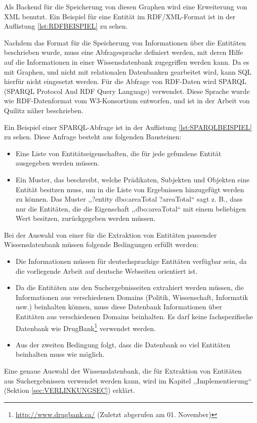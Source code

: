 Als Backend für die Speicherung von diesen Graphen wird eine Erweiterung von XML benutzt. Ein Beispiel für eine Entität im RDF/XML-Format ist in der Auflistung \ref{lst:RDFBEISPIEL} zu sehen.

\lstset{language=XML}


Nachdem das Format für die Speicherung von Informationen über die Entitäten beschrieben wurde, muss eine Abfragesprache definiert werden, mit deren Hilfe auf die Informationen in einer Wissensdatenbank zugegriffen werden kann. Da es mit Graphen, und nicht mit relationalen Datenbanken gearbeitet wird, kann SQL hierfür nicht eingesetzt werden. Für die Abfrage von RDF-Daten wird SPARQL (SPARQL Protocol And RDF Query Language) verwendet. Diese Sprache wurde wie RDF-Datenformat vom W3-Konsortium entworfen, und ist in der Arbeit von Quilitz\cite{quilitz2008querying} näher beschrieben.

Ein Beispiel einer SPARQL-Abfrage ist in der Auflistung \ref{lst:SPARQLBEISPIEL} zu sehen. Diese Anfrage besteht aus folgenden Bausteinen:
\begin{itemize}
\item Eine Liste von Entitätseigenschaften, die für jede gefundene Entität ausgegeben werden müssen.
\item Ein Muster, das beschreibt, welche Prädikaten, Subjekten und Objekten eine Entität besitzen muss, um in die Liste von Ergebnissen hinzugefügt werden zu können. Das Muster ,,?entity dbo:areaTotal ?areaTotal`` sagt z. B., dass nur die Entitäten, die die Eigenschaft ,,dbo:areaTotal`` mit einem beliebigen Wert besitzen, zurückgegeben werden müssen.
\end{itemize}

\lstset{language=SPARQL}


Bei der Auswahl von einer für die Extraktion von Entitäten passender Wissensdatenbank müssen folgende Bedingungen erfüllt werden:
\begin{itemize}
\item Die Informationen müssen für deutschsprachige Entitäten verfügbar sein, da die vorliegende Arbeit auf deutsche Webseiten orientiert ist.
\item Da die Entitäten aus den Suchergebnisseiten extrahiert werden müssen, die Informationen aus verschiedenen Domains (Politik, Wissenschaft, Informatik usw.) beinhalten können, muss diese Datenbank Informationen über Entitäten aus verschiedenen Domains beinhalten. Es darf keine fachspezifische Datenbank wie DrugBank\footnote{\url{http://www.drugbank.ca/} (Zuletzt abgerufen am 01. November)} verwendet werden.
\item Aus der zweiten Bedingung folgt, dass die Datenbank so viel Entitäten beinhalten muss wie möglich.
\end{itemize}
Eine genaue Auswahl der Wissensdatenbank, die für Extraktion von Entitäten aus Suchergebnissen verwendet werden kann, wird im Kapitel ,,Implementierung`` (Sektion \ref{sec:VERLINKUNGSEC}) erklärt.

